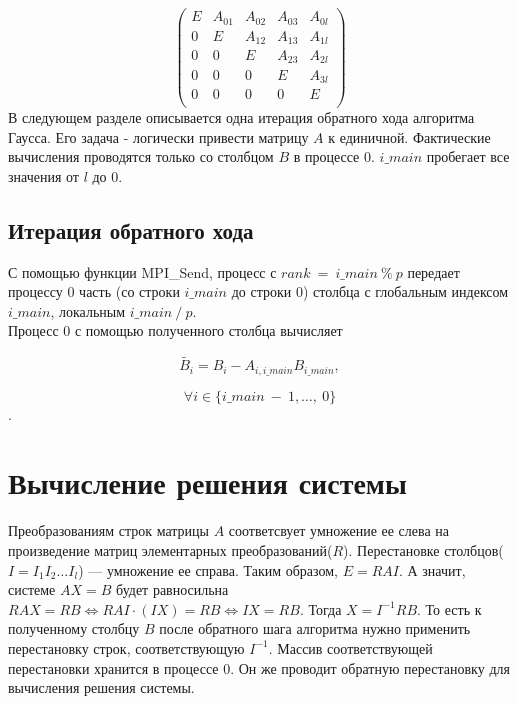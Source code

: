 \documentclass[11pt]{article}
\newcommand{\w}{\widetilde}
\begin{document}
$$\begin{pmatrix}
E		& A_{01}	& A_{02}	& A_{03} & A_{0l}\\
0		& E			& A_{12}	& A_{13} & A_{1l}\\
0		& 0			& E			& A_{23} & A_{2l}\\
0		& 0			& 0			& E 	 & A_{3l}\\
0		& 0 		& 0			& 0 	 & E\\
\end{pmatrix}$$
В следующем разделе описывается одна итерация обратного хода алгоритма Гаусса. Его задача - логически привести матрицу $A$ к единичной. Фактические вычисления проводятся только со столбцом $B$ в процессе $0$. $i\_main$ пробегает все значения от $l$ до $0$.
\subsection{Итерация обратного хода}
С помощью функции MPI\_Send, \label{itm:backward}процесс с $rank\ =\ i\_main\ \%\ p$ передает процессу $0$  часть (со строки $i\_main$ до строки $0$) столбца с глобальным индексом $i\_main$, локальным $i\_main\ /\ p$.
\\
Процесс $0$ с помощью полученного столбца вычисляет

$$\w{B_i} = B_i - A_{i,i\_main}B_{i\_main},$$

$$\forall i \in \{i\_main\ -\ 1,\ldots ,\ 0\}$$.
\newpage
\enlargethispage{11\baselineskip}
\section{Вычисление решения системы}
Преобразованиям строк матрицы $A$ соответсвует умножение ее слева на произведение матриц элементарных преобразований($R$). Перестановке столбцов($I=I_1I_2\ldots I_l$) --- умножение ее справа.
Таким образом, $E = RAI$. А значит, системе $AX=B$ будет равносильна $RAX=RB \Leftrightarrow RAI\cdot (IX)= RB \Leftrightarrow IX=RB.$ Тогда $X = I^{-1}RB$. То есть к полученному столбцу $B$ после обратного шага алгоритма нужно применить перестановку строк, соответствующую $I^{-1}$.
Массив соответствующей перестановки хранится в процессе $0$. Он же проводит обратную перестановку для вычисления решения системы.
\end{document}
